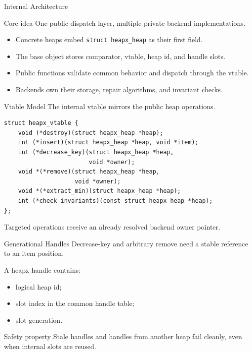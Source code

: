 \documentclass[10pt,aspectratio=43]{beamer}
\begin{document}
\begin{frame}{Internal Architecture}
    \begin{block}{Core idea}
        One public dispatch layer, multiple private backend implementations.
    \end{block}

    \vspace{0.4em}
    \begin{itemize}
        \item Concrete heaps embed \texttt{struct heapx\_heap} as their first field.
        \item The base object stores comparator, vtable, heap id, and handle slots.
        \item Public functions validate common behavior and dispatch through the vtable.
        \item Backends own their storage, repair algorithms, and invariant checks.
    \end{itemize}
\end{frame}

\begin{frame}[fragile]{Vtable Model}
    The internal vtable mirrors the public heap operations.

    \begin{lstlisting}[style=cstyle]
struct heapx_vtable {
    void (*destroy)(struct heapx_heap *heap);
    int (*insert)(struct heapx_heap *heap, void *item);
    int (*decrease_key)(struct heapx_heap *heap,
                        void *owner);
    void *(*remove)(struct heapx_heap *heap,
                    void *owner);
    void *(*extract_min)(struct heapx_heap *heap);
    int (*check_invariants)(const struct heapx_heap *heap);
};
    \end{lstlisting}

    Targeted operations receive an already resolved backend owner pointer.
\end{frame}

\begin{frame}{Generational Handles}
    Decrease-key and arbitrary remove need a stable reference to an item position.

    \vspace{0.4em}
    A heapx handle contains:
    \begin{itemize}
        \item logical heap id;
        \item slot index in the common handle table;
        \item slot generation.
    \end{itemize}

    \vspace{0.5em}
    \begin{block}{Safety property}
        Stale handles and handles from another heap fail cleanly, even when internal slots are reused.
    \end{block}
\end{frame}
\end{document}
